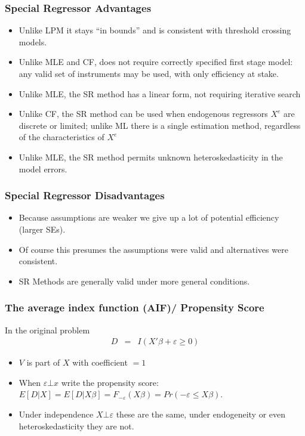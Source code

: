 \documentclass[11pt,dvipsnames,table,aspectratio=169]{beamer}
\begin{document}
\begin{frame}
\frametitle{Special Regressor Advantages}
\begin{itemize}
\item Unlike LPM it stays ``in bounds'' and is consistent with threshold crossing models.
\item Unlike MLE and CF, does not require correctly specified first stage model: any valid set of instruments may be used, with only efficiency at stake.
\item Unlike MLE, the SR method has a linear form, not requiring iterative search
\item Unlike CF, the SR method can be used when endogenous regressors $X^e$ are discrete or limited; unlike ML there is a single estimation method, regardless of the characteristics of $X^e$
\item Unlike MLE, the SR method permits unknown heteroskedasticity in the model errors.
\end{itemize}
\end{frame}

\begin{frame}
\frametitle{Special Regressor Disadvantages}
\begin{itemize}
\item Because assumptions are weaker we give up a lot of potential efficiency (larger SEs).
\item Of course this presumes the assumptions were valid and alternatives were consistent.
\item SR Methods are generally valid under more general conditions.
\end{itemize}
\end{frame}

\begin{frame}
\frametitle{ The average index function (AIF)/ Propensity Score}
In the original problem
\begin{eqnarray*}
D &=& I ( X' \beta + \varepsilon \geq 0 )
\end{eqnarray*}
\begin{itemize}
\item $V$ is part of $X$ with coefficient $=1$
\item When $\varepsilon \bot x$ write the propensity score: $E[D | X] = E[D | X \beta] = F_{-\varepsilon} (X \beta)  = Pr(- \varepsilon \leq X \beta)$. 
\item Under independence $X \bot \varepsilon$ these are the same, under endogeneity or even heteroskedasticity they are not.
\end{itemize}
\end{frame}
\end{document}
